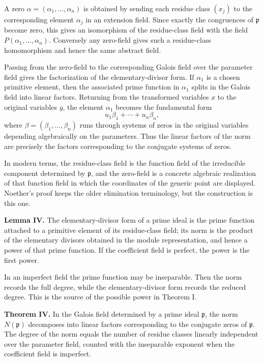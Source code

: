\documentclass[12pt]{article}
\begin{document}
A zero $\alpha=(\alpha_1,\ldots,\alpha_n)$ is obtained by sending each residue class $(x_j)$ to the corresponding element $\alpha_j$ in an extension field. Since exactly the congruences of $\mathfrak p$ become zero, this gives an isomorphism of the residue-class field with the field $P(\alpha_1,\ldots,\alpha_n)$. Conversely any zero-field gives such a residue-class homomorphism and hence the same abstract field.

Passing from the zero-field to the corresponding Galois field over the parameter field gives the factorization of the elementary-divisor form. If $\alpha_1$ is a chosen primitive element, then the associated prime function in $\alpha_1$ splits in the Galois field into linear factors. Returning from the transformed variables $x$ to the original variables $y$, the element $\alpha_1$ becomes the fundamental form
\[
  u_1\beta_1+\cdots+u_n\beta_n,
\]
where $\beta=(\beta_1,\ldots,\beta_n)$ runs through systems of zeros in the original variables depending algebraically on the parameters. Thus the linear factors of the norm are precisely the factors corresponding to the conjugate systems of zeros.

In modern terms, the residue-class field is the function field of the irreducible component determined by $\mathfrak p$, and the zero-field is a concrete algebraic realization of that function field in which the coordinates of the generic point are displayed. Noether's proof keeps the older elimination terminology, but the construction is this one.

\textbf{Lemma IV.} The elementary-divisor form of a prime ideal is the prime function attached to a primitive element of its residue-class field; its norm is the product of the elementary divisors obtained in the module representation, and hence a power of that prime function. If the coefficient field is perfect, the power is the first power.

In an imperfect field the prime function may be inseparable. Then the norm records the full degree, while the elementary-divisor form records the reduced degree. This is the source of the possible power in Theorem I.

\textbf{Theorem IV.} In the Galois field determined by a prime ideal $\mathfrak p$, the norm $N(\mathfrak p)$ decomposes into linear factors corresponding to the conjugate zeros of $\mathfrak p$. The degree of the norm equals the number of residue classes linearly independent over the parameter field, counted with the inseparable exponent when the coefficient field is imperfect.
\end{document}
